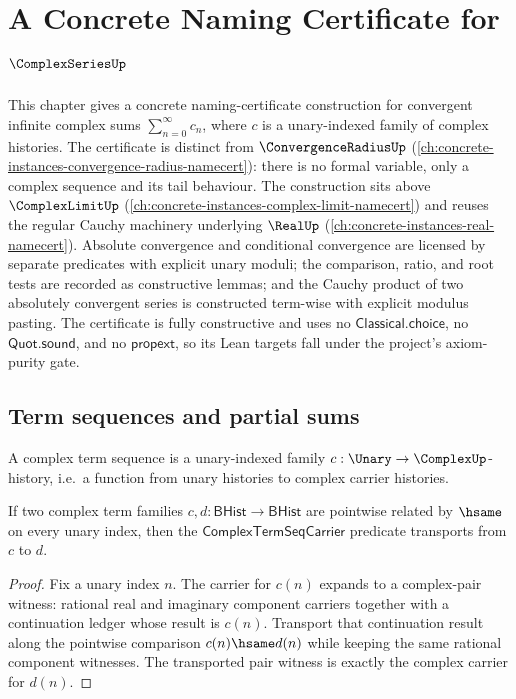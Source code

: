 \chapter{A Concrete Naming Certificate for \(\ComplexSeriesUp\)}
\label{ch:concrete-instances-complex-series-namecert}

This chapter gives a concrete naming-certificate construction for convergent infinite complex sums \(\sum_{n=0}^{\infty} c_n\), where \(c\) is a unary-indexed family of complex histories. The certificate is distinct from \(\ConvergenceRadiusUp\) (\autoref{ch:concrete-instances-convergence-radius-namecert}): there is no formal variable, only a complex sequence and its tail behaviour. The construction sits above \(\ComplexLimitUp\) (\autoref{ch:concrete-instances-complex-limit-namecert}) and reuses the regular Cauchy machinery underlying \(\RealUp\) (\autoref{ch:concrete-instances-real-namecert}). Absolute convergence and conditional convergence are licensed by separate predicates with explicit unary moduli; the comparison, ratio, and root tests are recorded as constructive lemmas; and the Cauchy product of two absolutely convergent series is constructed term-wise with explicit modulus pasting. The certificate is fully constructive and uses no \(\mathsf{Classical.choice}\), no \(\mathsf{Quot.sound}\), and no \(\mathsf{propext}\), so its Lean targets fall under the project's axiom-purity gate.

\section{Term sequences and partial sums}

\begin{definition}
\label{def:complex-term-seq}
A complex term sequence is a unary-indexed family \(c : \Unary \to \ComplexUp\)-history, i.e.\ a function from unary histories to complex carrier histories.
\end{definition}

\begin{lemma}
\label{lem:complex-term-seq-carrier-hsame-transport}
If two complex term families $c,d:\mathsf{BHist}\to\mathsf{BHist}$ are
pointwise related by $\hsame$ on every unary index, then the
$\mathsf{ComplexTermSeqCarrier}$ predicate transports from $c$ to $d$.
\end{lemma}
\begin{proof}
Fix a unary index $n$. The carrier for $c(n)$ expands to a complex-pair witness:
rational real and imaginary component carriers together with a continuation
ledger whose result is $c(n)$. Transport that continuation result along the
pointwise comparison $c(n)\hsame d(n)$ while keeping the same rational
component witnesses. The transported pair witness is exactly the complex carrier
for $d(n)$.
\end{proof}

